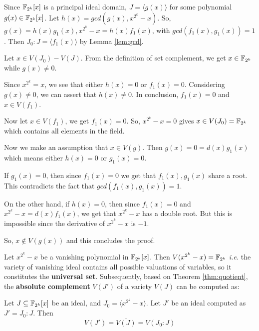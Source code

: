 \begin{Proof}
Since ${\mathbb{F}}_{2^k}[x]$ is a principal ideal domain, $ J = \langle g(x)\rangle$
for some polynomial $ g(x) \in {\mathbb{F}}_{2^k}[x]$. Let $h(x) = gcd(g(x), x^{2^k} -
x)$. So, $g(x) = h(x)g_1(x) , x^{2^k} - x = h(x)f_1(x)$, with $gcd(f_1(x) , g_1(x) ) =
1$. Then $J_0 : J = \langle f_1(x) \rangle$ by Lemma \ref{lem:gcd}. 

Let $x \in V(J_0 ) - V(J)$. From the definition of set
complement, we get $x \in {\mathbb{F}}_{2^k}$ while $g(x) \neq 0$.  

Since $x^{2^k} = x$, we see that either $h(x) = 0$ or $f_1 (x) =
0$. Considering $g(x) \neq 0$, we can assert that $h(x) \neq 0$. In
conclusion, $f_1 (x) = 0$ and $x \in V(f_1 )$. 

Now let $x \in V(f_1 )$, we get $f_1 (x) = 0$. So, $x^{2^k} - x = 0$
gives $x \in V(J_0) = {\mathbb{F}}_{2^k}$ which  contains all elements in the
field. 

Now we make an assumption that $x \in V(g)$. Then $g(x) = 0 =
d(x)g_1(x)$ which means either $h(x) = 0$ or $g_1 (x) = 0$. 

If $g_1 (x) = 0$, then since $f_1 (x) = 0$ we get that $f_1(x) , g_1(x)$
share a root. This contradicts the fact that $gcd(f_1(x) , g_1(x) ) = 1$.

On the other hand, if $h(x) = 0$, then since $f_1 (x) = 0$ and
$x^{2^k} - x = d(x)f_1(x)$, we get that $x^{2^k} - x$ has a double root. 
But this is impossible since the derivative of $x^{2^k} - x$ is $-1$.

So, $x \notin V(g(x))$ and this concludes the proof.
\end{Proof}


Let $x^{2^k}-x$ be a vanishing polynomial in ${\mathbb{F}}_{2^k}[x]$. Then $V(x^{2^k}-x)={\mathbb{F}}_{2^k}$
{\it i.e.} the variety of vanishing ideal contains
 all possible valuations of variables, so it constitutes the {\bf
   universal set}. Subsequently, based on Theorem \ref{thm:quotient},
 the {\bf absolute complement} $V(J')$ of a variety $V(J)$ can be
 computed as: 

\begin{Corollary} \label{cor:complement}
Let $J\subseteq {\mathbb{F}}_{2^k}[x]$ be an ideal, and $J_0=\langle x^{2^k}-x\rangle$. Let $J'$ be an ideal 
computed as $J' = J_0:J$. Then $$V(J') = \overline{V(J)} = {V}(J_0:J)$$
\end{Corollary}


